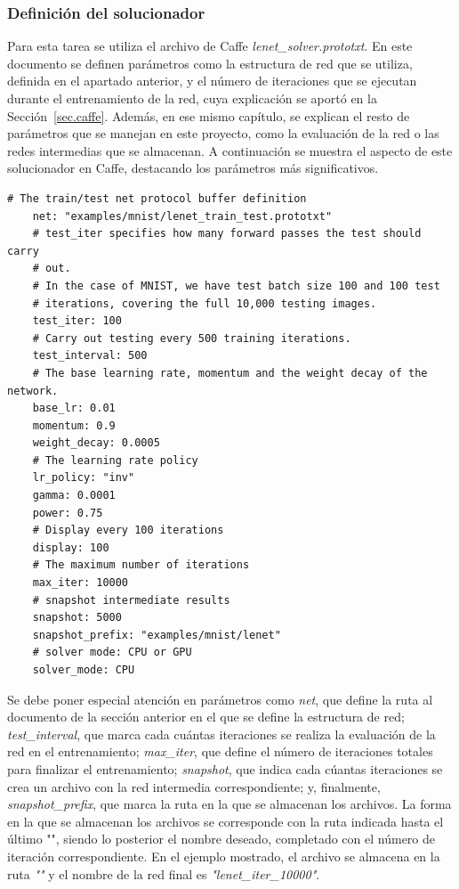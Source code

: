 \subsubsection{Definición del solucionador}
	Para esta tarea se utiliza el archivo de Caffe \textit{lenet\_solver.prototxt}. En este documento se definen parámetros como la estructura de red que se utiliza, definida en el apartado anterior, y el número de iteraciones que se ejecutan durante el entrenamiento de la red, cuya explicación se aportó en la Sección~\ref{sec.caffe}. Además, en ese mismo capítulo, se explican el resto de parámetros que se manejan en este proyecto, como la evaluación de la red o las redes intermedias que se almacenan. A continuación se muestra el aspecto de este solucionador en Caffe, destacando los parámetros más significativos.
	\vspace{80pt}
	\begin{lstlisting}[frame=single]
	# The train/test net protocol buffer definition
	net: "examples/mnist/lenet_train_test.prototxt"
	# test_iter specifies how many forward passes the test should carry 
	# out.
	# In the case of MNIST, we have test batch size 100 and 100 test
	# iterations, covering the full 10,000 testing images.
	test_iter: 100
	# Carry out testing every 500 training iterations.
	test_interval: 500
	# The base learning rate, momentum and the weight decay of the network.
	base_lr: 0.01
	momentum: 0.9
	weight_decay: 0.0005
	# The learning rate policy
	lr_policy: "inv"
	gamma: 0.0001
	power: 0.75
	# Display every 100 iterations
	display: 100
	# The maximum number of iterations
	max_iter: 10000
	# snapshot intermediate results
	snapshot: 5000
	snapshot_prefix: "examples/mnist/lenet"
	# solver mode: CPU or GPU
	solver_mode: CPU	
	\end{lstlisting}
	
	Se debe poner especial atención en parámetros como \textit{net}, que define la ruta al documento de la sección anterior en el que se define la estructura de red; \textit{test\_interval}, que marca cada cuántas iteraciones se realiza la evaluación de la red en el entrenamiento; \textit{max\_iter}, que define el número de iteraciones totales para finalizar el entrenamiento; \textit{snapshot}, que indica cada cúantas iteraciones se crea un archivo con la red intermedia correspondiente; y, finalmente, \textit{snapshot\_prefix}, que marca la ruta en la que se almacenan los archivos. La forma en la que se almacenan los archivos se corresponde con la ruta indicada hasta el último "\text{/}", siendo lo posterior el nombre deseado, completado con el número de iteración correspondiente. En el ejemplo mostrado, el archivo se almacena en la ruta \textit{""}    y el nombre de la red final es \textit{"lenet\_iter\_10000"}.\\
	
